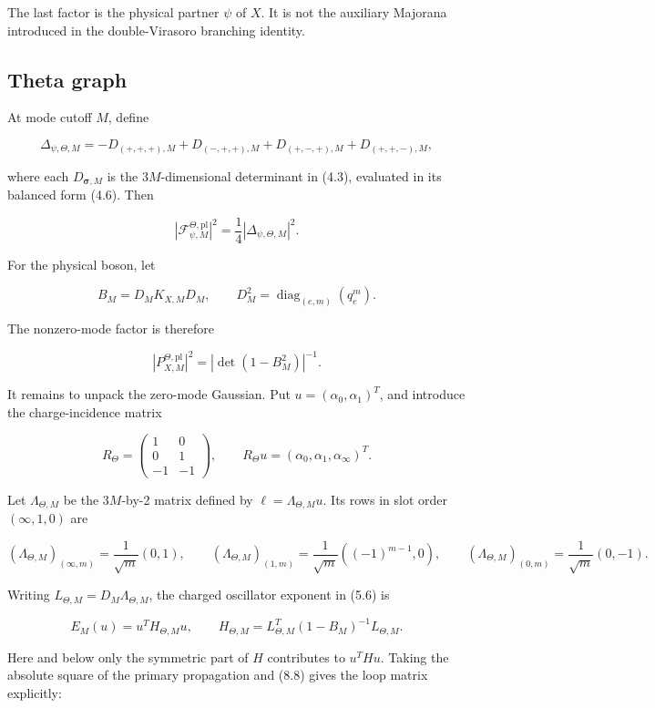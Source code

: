 \documentclass[11pt]{article}
\begin{document}
The last factor is the physical partner \(\psi\) of \(X\).  It is not the
auxiliary Majorana introduced in the double-Virasoro branching identity.

\subsection{Theta graph}

At mode cutoff \(M\), define

\[
 \Delta_{\psi,\Theta,M}
 =-D_{(+,+,+),M}+D_{(-,+,+),M}
   +D_{(+,-,+),M}+D_{(+,+,-),M},
\tag{8.2}
\]

where each \(D_{\boldsymbol\sigma,M}\) is the \(3M\)-dimensional determinant
in (4.3), evaluated in its balanced form (4.6).  Then

\[
 |\mathcal F_{\psi,M}^{\Theta,\mathrm{pl}}|^2
 =\frac14|\Delta_{\psi,\Theta,M}|^2.
\tag{8.3}
\]

For the physical boson, let

\[
 B_M=D_MK_{X,M}D_M,
 \qquad
 D_M^2=\operatorname{diag}_{(e,m)}(q_e^m).
\tag{8.4}
\]

The nonzero-mode factor is therefore

\[
 |P_{X,M}^{\Theta,\mathrm{pl}}|^2
 =\left|\det(1-B_M^2)\right|^{-1}.
\tag{8.5}
\]

It remains to unpack the zero-mode Gaussian.  Put
\(u=(\alpha_0,\alpha_1)^T\), and introduce the charge-incidence matrix

\[
 R_\Theta=
 \begin{pmatrix}
  1&0\\0&1\\-1&-1
 \end{pmatrix},
 \qquad
 R_\Theta u=(\alpha_0,\alpha_1,\alpha_\infty)^T.
\tag{8.6}
\]

Let \(\Lambda_{\Theta,M}\) be the \(3M\)-by-2 matrix defined by
\(\ell=\Lambda_{\Theta,M}u\).  Its rows in slot order
\((\infty,1,0)\) are

\[
 (\Lambda_{\Theta,M})_{(\infty,m)}
  =\frac1{\sqrt m}(0,1),\qquad
 (\Lambda_{\Theta,M})_{(1,m)}
  =\frac1{\sqrt m}((-1)^{m-1},0),\qquad
 (\Lambda_{\Theta,M})_{(0,m)}
  =\frac1{\sqrt m}(0,-1).
\tag{8.7}
\]

Writing \(L_{\Theta,M}=D_M\Lambda_{\Theta,M}\), the charged oscillator
exponent in (5.6) is

\[
 E_M(u)=u^TH_{\Theta,M}u,
 \qquad
 H_{\Theta,M}
 =L_{\Theta,M}^T(1-B_M)^{-1}L_{\Theta,M}.
\tag{8.8}
\]

Here and below only the symmetric part of \(H\) contributes to \(u^THu\).
Taking the absolute square of the primary propagation and (8.8) gives the
loop matrix explicitly:
\end{document}
